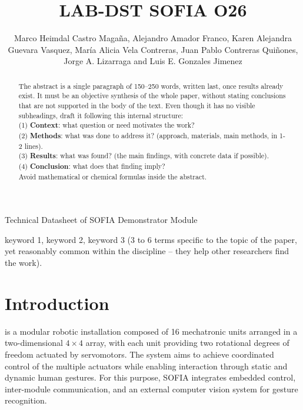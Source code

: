 \documentclass[lettersize,journal]{IEEEtran}
\begin{document}
	
	\title{LAB-DST SOFIA O26}
	
	\author{
		Marco Heimdal Castro Magaña, Alejandro Amador Franco, Karen Alejandra Guevara Vasquez, María Alicia Vela Contreras, Juan Pablo Contreras Quiñones,
		Jorge A. Lizarraga and Luis E. Gonzales Jimenez 
	}
	
	{Technical Datasheet of SOFIA Demonstrator Module}
	
	\maketitle
	
	\begin{abstract}
		The abstract is a single paragraph of 150--250 words, written last,
		once results already exist. It must be an objective synthesis of the
		whole paper, without stating conclusions that are not supported in the
		body of the text. Even though it has no visible subheadings, draft it
		following this internal structure: \\
		(1) \textbf{Context}: what question or need motivates the work? \\
		(2) \textbf{Methods}: what was done to address it? (approach,
		materials, main methods, in 1-2 lines). \\
		(3) \textbf{Results}: what was found? (the main findings, with
		concrete data if possible). \\
		(4) \textbf{Conclusion}: what does that finding imply? \\
		Avoid mathematical or chemical formulas inside the abstract.
	\end{abstract}
	
	\begin{IEEEkeywords}
		keyword 1, keyword 2, keyword 3 (3 to 6 terms specific to the
		topic of the paper, yet reasonably common within the discipline --
		they help other researchers find the work).
	\end{IEEEkeywords}
	
	\section{Introduction}
	
	 is a modular robotic installation composed of 16
	mechatronic units arranged in a two-dimensional $4 \times 4$ array, with each
	unit providing two rotational degrees of freedom actuated by servomotors. The
	system aims to achieve coordinated control of the multiple actuators while
	enabling interaction through static and dynamic human gestures. For this
	purpose, SOFIA integrates embedded control, inter-module communication, and an
	external computer vision system for gesture recognition.
	
\end{document}

